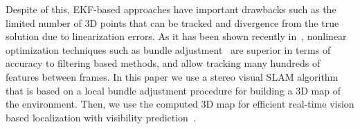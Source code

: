 Despite of this, EKF-based approaches have important drawbacks such as the limited number of 3D points that can be tracked and divergence from the true solution due to linearization errors. As it has been
shown recently in~\cite{Strasdat10icra}, nonlinear optimization techniques such as bundle adjustment~\cite{Mouragnon09ivc} are superior in terms of accuracy to filtering based methods, and allow
tracking many hundreds of features between frames. In this paper we use a stereo visual SLAM algorithm that is based on a local bundle adjustment procedure for building a 3D map of the environment. Then,
we use the computed 3D map for efficient real-time vision based localization with visibility
prediction~\cite{Alcantarilla10icra,Alcantarilla11icra}.

